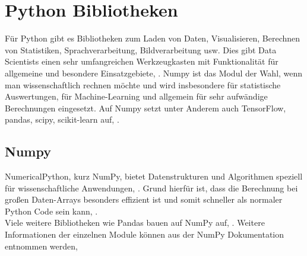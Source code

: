 \chapter{Python Bibliotheken}

Für Python gibt es Bibliotheken zum Laden von Daten, Visualisieren, Berechnen von Statistiken, Sprachverarbeitung, Bildverarbeitung usw. Dies gibt Data Scientists einen sehr umfangreichen Werkzeugkasten mit Funktionalität für allgemeine und besondere Einsatzgebiete, \cite{Mueller:2017}.
Numpy ist das Modul der Wahl, wenn man wissenschaftlich rechnen möchte und wird insbesondere für statistische Auswertungen, für Machine-Learning und allgemein für sehr aufwändige Berechnungen eingesetzt. Auf Numpy setzt unter Anderem auch TensorFlow, pandas, scipy, scikit-learn auf, \cite{Häberlein:2024}.

\section{Numpy}
NumericalPython, kurz NumPy, bietet Datenstrukturen und Algorithmen speziell für wissenschaftliche Anwendungen, \cite{McKinney:2023}. Grund hierfür ist, dass die Berechnung bei großen Daten-Arrays besonders effizient ist und somit schneller als normaler Python Code sein kann, \cite{McKinney:2023}. \\
Viele weitere Bibliotheken wie Pandas bauen auf NumPy auf, \cite{VanderPlas:2023}. Weitere Informationen der einzelnen Module können aus der NumPy Dokumentation entnommen werden, \cite{NumPy}

